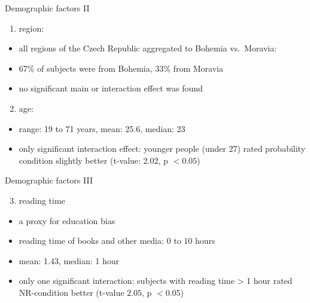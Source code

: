 \documentclass[
  ignorenonframetext,
]{beamer}
\providecommand{\tightlist}{%
  \setlength{\itemsep}{0pt}\setlength{\parskip}{0pt}}
\begin{document}
\begin{frame}
\begin{block}{Demographic factors II}
\protect\hypertarget{demographic-factors-ii}{}
\begin{enumerate}
\tightlist
\item
  region:
\end{enumerate}

\begin{itemize}
\tightlist
\item
  all regions of the Czech Republic aggregated to Bohemia vs.~Moravia:
\item
  67\% of subjects were from Bohemia, 33\% from Moravia
\item
  no significant main or interaction effect was found
\end{itemize}

\begin{enumerate}
\setcounter{enumi}{1}
\tightlist
\item
  age:
\end{enumerate}

\begin{itemize}
\tightlist
\item
  range: 19 to 71 years, mean: 25.6, median: 23
\item
  only significant interaction effect: younger people (under 27) rated
  probability condition slightly better (t-value: \(2.02\), p
  \(< 0.05\))
\end{itemize}
\end{block}
\end{frame}

\begin{frame}
\begin{block}{Demographic factors III}
\protect\hypertarget{demographic-factors-iii}{}
\begin{enumerate}
\setcounter{enumi}{2}
\tightlist
\item
  reading time
\end{enumerate}

\begin{itemize}
\tightlist
\item
  a proxy for education bias
\item
  reading time of books and other media: 0 to 10 hours
\item
  mean: 1.43, median: 1 hour
\item
  only one significant interaction: subjects with reading time
  \textgreater{} 1 hour rated NR-condition better (t-value \(2.05\), p
  \(< 0.05\))
\end{itemize}
\end{block}
\end{frame}
\end{document}
